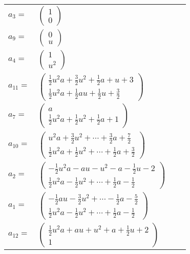 \documentclass[1p]{elsarticle_modified}
\theoremstyle{definition}
\begin{document}
\begin{tabular}{m{7pt} m{180pt} m{7pt} m{180pt} }
\flushright $a_{3}=$&$\begin{pmatrix}1\\0\end{pmatrix}$ \\
\flushright $a_{9}=$&$\begin{pmatrix}0\\u\end{pmatrix}$ \\
\flushright $a_{4}=$&$\begin{pmatrix}1\\u^2\end{pmatrix}$ \\
\flushright $a_{11}=$&$\begin{pmatrix}\frac{1}{2} u^2 a+\frac{3}{2} u^2+\frac{1}{2} a+u+3\\\frac{1}{2} u^2 a+\frac{1}{2} a u+\frac{1}{2} u+\frac{3}{2}\end{pmatrix}$ \\
\flushright $a_{7}=$&$\begin{pmatrix}a\\\frac{1}{2} u^2 a+\frac{1}{2} u^2+\frac{1}{2} a+1\end{pmatrix}$ \\
\flushright $a_{10}=$&$\begin{pmatrix}u^2 a+\frac{3}{2} u^2+\cdots+\frac{3}{2} a+\frac{7}{2}\\\frac{1}{2} u^2 a+\frac{1}{2} u^2+\cdots+\frac{1}{2} a+\frac{3}{2}\end{pmatrix}$ \\
\flushright $a_{2}=$&$\begin{pmatrix}-\frac{1}{2} u^2 a- a u- u^2- a-\frac{1}{2} u-2\\\frac{1}{2} u^2 a-\frac{1}{2} u^2+\cdots+\frac{1}{2} a-\frac{1}{2}\end{pmatrix}$ \\
\flushright $a_{1}=$&$\begin{pmatrix}-\frac{1}{2} a u-\frac{3}{2} u^2+\cdots-\frac{1}{2} a-\frac{5}{2}\\\frac{1}{2} u^2 a-\frac{1}{2} u^2+\cdots+\frac{1}{2} a-\frac{1}{2}\end{pmatrix}$ \\
\flushright $a_{12}=$&$\begin{pmatrix}\frac{1}{2} u^2 a+a u+u^2+a+\frac{1}{2} u+2\\1\end{pmatrix}$ \\

\end{tabular}
\end{document}
